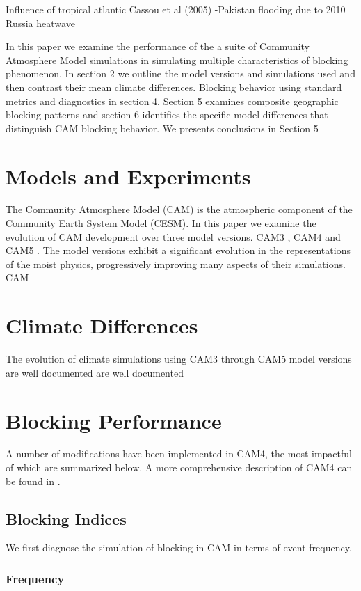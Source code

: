 \documentclass[12pt,varwidth]{article}
\begin{document}
Influence of tropical atlantic \cite{Cassou05}
Cassou et al (2005)
-Pakistan flooding due to 2010 Russia heatwave \cite{Galarneau12}


In this paper we examine the performance of the a suite of Community Atmosphere Model simulations in simulating multiple characteristics of blocking phenomenon. In section 2 we outline the model versions and simulations used and then contrast their mean climate differences. Blocking behavior using standard metrics and diagnostics in section 4. Section 5 examines composite geographic blocking patterns and section 6 identifies the specific model differences that distinguish CAM blocking behavior. We presents conclusions in Section 5 


\section{Models and Experiments}

The Community Atmosphere Model (CAM) is the atmospheric component of the Community Earth System Model (CESM). In this paper we examine the evolution of CAM development over three model versions. CAM3 \citep{CAM3}, CAM4 \citep{CAM4} and CAM5 \citep{CESM1}. The model versions exhibit a significant evolution in the representations of the moist physics, progressively improving many aspects of their simulations. CAM

\section{Climate Differences}
The evolution of climate simulations using CAM3 through CAM5 model versions are well documented are well documented \citep{CAM3,CCSM3,CAM4,CCSM4_oview,CESM1}

\section{Blocking Performance}
A number of modifications have been implemented in CAM4, the most impactful of which are summarized below. A more comprehensive description of CAM4 can be found in \citet{CAM4_TN}.

\subsection{Blocking Indices}
We first diagnose the simulation of blocking in CAM in terms of event frequency. 
\subsubsection{Frequency}
\end{document}
